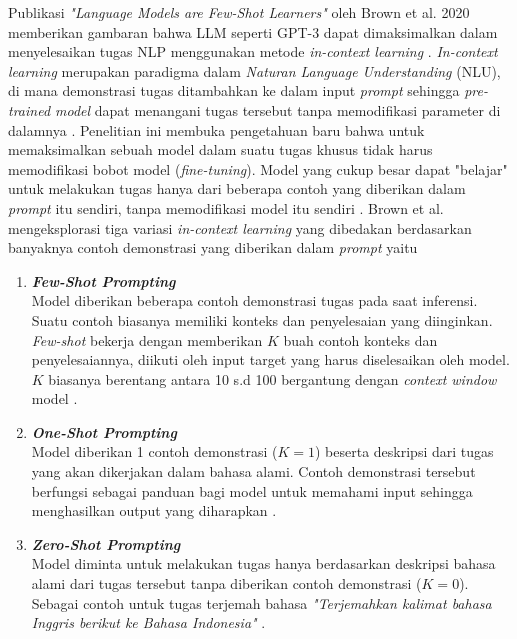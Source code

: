 Publikasi \textit{"Language Models are Few-Shot Learners"} oleh Brown et al. 2020 memberikan gambaran bahwa LLM seperti GPT-3 dapat dimaksimalkan dalam menyelesaikan tugas NLP menggunakan metode \textit{in-context learning} \cite{LLMisFewShot2020}.
\textit{In-context learning} merupakan paradigma dalam \textit{Naturan Language Understanding} (NLU), di mana demonstrasi tugas ditambahkan ke dalam input \textit{prompt} sehingga \textit{pre-trained model} dapat menangani tugas tersebut tanpa memodifikasi parameter di dalamnya \cite{Dong2024SurveyInContextLearning}.
Penelitian ini membuka pengetahuan baru bahwa untuk memaksimalkan sebuah model dalam suatu tugas khusus tidak harus memodifikasi bobot model (\textit{fine-tuning}).
Model yang cukup besar dapat "belajar" untuk melakukan tugas hanya dari beberapa contoh yang diberikan dalam \textit{prompt} itu sendiri, tanpa memodifikasi model itu sendiri \cite{LLMisFewShot2020}.
Brown et al. mengeksplorasi tiga variasi \textit{in-context learning} yang dibedakan berdasarkan banyaknya contoh demonstrasi yang diberikan dalam \textit{prompt} yaitu

\begin{enumerate}
	\item \textbf{\textit{Few-Shot Prompting}} \\
	      Model diberikan beberapa contoh demonstrasi tugas pada saat inferensi. Suatu contoh biasanya memiliki konteks dan penyelesaian yang diinginkan.
	      \textit{Few-shot} bekerja dengan memberikan $K$ buah contoh konteks dan penyelesaiannya, diikuti oleh input target yang harus diselesaikan oleh model.
	      $K$ biasanya berentang antara 10 s.d 100 bergantung dengan \textit{context window} model \cite{LLMisFewShot2020}.
	\item \textbf{\textit{One-Shot Prompting}} \\
	      Model diberikan 1 contoh demonstrasi ($K=1$) beserta deskripsi dari tugas yang akan dikerjakan dalam bahasa alami.
	      Contoh demonstrasi tersebut berfungsi sebagai panduan bagi model untuk memahami input sehingga menghasilkan output yang diharapkan \cite{LLMisFewShot2020}.
	\item \textbf{\textit{Zero-Shot Prompting}} \\
	      Model diminta untuk melakukan tugas hanya berdasarkan deskripsi bahasa alami dari tugas tersebut tanpa diberikan contoh demonstrasi ($K = 0$).
	      Sebagai contoh untuk tugas terjemah bahasa \textit{"Terjemahkan kalimat bahasa Inggris berikut ke Bahasa Indonesia"} \cite{LLMisFewShot2020}.
\end{enumerate}

